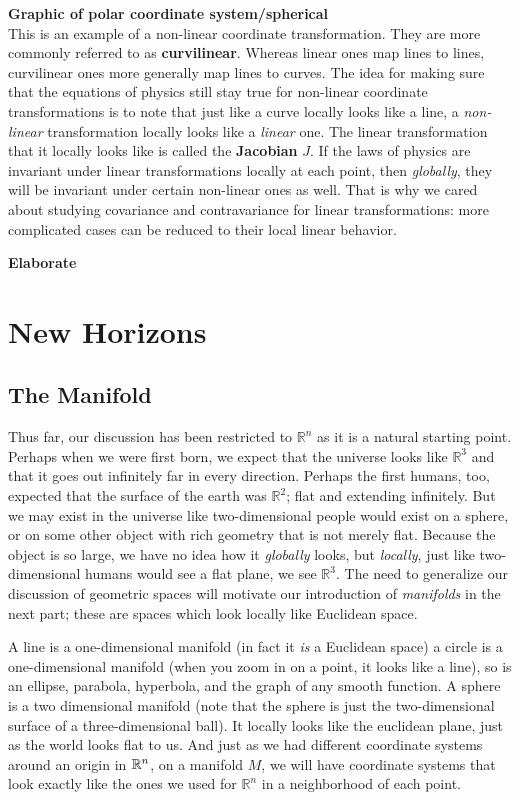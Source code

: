 	\textbf{Graphic of polar coordinate system/spherical} \\
	
	This is an example of a non-linear coordinate transformation. They are more commonly referred to as \textbf{curvilinear}. Whereas linear ones map lines to lines, curvilinear ones more generally map lines to curves. The idea for making sure that the equations of physics still stay true for non-linear coordinate transformations is to note that just like a curve locally looks like a line, a \emph{non-linear} transformation locally looks like a \emph{linear} one. The linear transformation that it locally looks like is called the \textbf{Jacobian}  $J$. If the laws of physics are invariant under linear transformations locally at each point, then \emph{globally}, they will be invariant under certain non-linear ones as well. That is why we cared about studying covariance and contravariance for linear transformations: more complicated cases can be reduced to their local linear behavior. 
	
	
	\textbf{Elaborate}
	
\chapter{New Horizons}	
	\section{The Manifold} %
	\label{sec:the_manifold}
	
	Thus far, our discussion has been restricted to $\mathbb{R}^n$ as it is a natural starting point.  Perhaps when we were first born, we expect that the universe looks like $\mathbb{R}^3$ and that it goes out infinitely far in every direction.  Perhaps the first humans, too, expected that the surface of the earth was $\mathbb R^2$; flat and extending infinitely.  But we may exist in the universe like two-dimensional people would exist on a sphere, or on some other object with rich geometry that is not merely flat. Because the object is so large, we have no idea how it \emph{globally} looks, but \emph{locally}, just like two-dimensional humans would see a flat plane, we see $\mathbb R^3$. The need to generalize our discussion of geometric spaces will motivate our introduction of \textit{manifolds} in the next part; these are spaces which look locally like Euclidean space.
	
	A line is a one-dimensional manifold (in fact it \emph{is} a Euclidean space) a circle is a one-dimensional manifold (when you zoom in on a point, it looks like a line), so is an ellipse, parabola, hyperbola, and the graph of any smooth function. A sphere is a two dimensional manifold (note that the sphere is just the two-dimensional surface of a three-dimensional ball). It locally looks like the euclidean plane, just as the world looks flat to us.   And just as we had different coordinate systems around an origin in $\mathbb{R}^n$, on a manifold $M$, we will  have coordinate systems that look exactly like the ones we used for $\mathbb{R}^n$ in a neighborhood of each point. 
	
